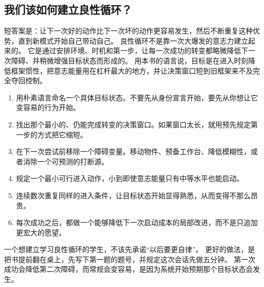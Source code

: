 \subsection{我们该如何建立良性循环？}

短答案是：让下一次好的动作比下一次坏的动作更容易发生，然后不断重复这种优势，直到新模式开始自己带动自己。
良性循环不是靠一次大爆发的意志力建立起来的。
它是通过安排环境、时机和第一步，让每一次成功的转变都略微降低下一次障碍、并稍微增强目标状态而形成的。
用本书的语言说，目标是在进入时刻降低框架惯性，把意志能量用在杠杆最大的地方，并让决策窗口短到旧框架来不及完全夺回控制。

\begin{enumerate}[nosep]
  \item 用朴素语言命名一个具体目标状态。不要先从身份宣言开始，要先从你想让它变容易的行为开始。
  \item 找出那个最小的、仍能完成转变的决策窗口。如果窗口太长，就用预先规定第一步的方式把它缩短。
  \item 在下一次尝试前移除一个障碍变量。移动物件、预备工作台、降低模糊性，或者消除一个可预测的打断源。
  \item 规定一个最小可行进入动作，小到即使意志能量只有中等水平也能启动。
  \item 连续数次重复同样的进入条件，让目标状态开始显得熟悉，从而变得不那么昂贵。
  \item 每次成功之后，都做一个能够降低下一次启动成本的局部改进，而不是只追加更宏大的愿望。
\end{enumerate}

\begin{remark}
一个想建立学习良性循环的学生，不该先承诺“以后要更自律”。
更好的做法，是把书提前翻在桌上，先写下第一题的题号，并规定这次会话先做五分钟。
第一次成功会降低第二次障碍，而常规会变容易，是因为系统开始预期那个目标状态会发生。
\end{remark}